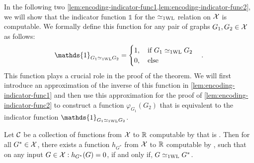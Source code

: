 In the following two \cref{lem:encoding-indicator-func1,lem:encoding-indicator-func2}, we will show that the indicator function $\mathds{1}$ for the $\simeq_{\text{1WL}}$ relation on $\mathcal{X}$ is \wlnn computable. We formally define this function for any pair of graphs $G_1, G_2 \in \mathcal{X}$ as follows:
\begin{equation*}
    \mathds{1}_{G_1 \wliso G_2} = \begin{cases}
        1, \quad \text{if $G_1 \wliso G_2$}\\
        0, \quad \text{else}
    \end{cases}.
\end{equation*}
This function plays a crucial role in the proof of the theorem. We will first introduce an approximation of the inverse of this function in \cref{lem:encoding-indicator-func1} and then use this approximation for the proof of \cref{lem:encoding-indicator-func2} to construct a function $\varphi_{G_1}(G_2)$ that is equivalent to the indicator function $\mathds{1}_{G_1 \wliso G_2}$.

\begin{lemma}\label{lem:encoding-indicator-func1}
    Let $\mathcal{C}$ be a collection of functions from $\mathcal{X}$ to $\mathbb{R}$ computable by \wlnn that is \wldisc. Then for all $G^* \in \mathcal{X}$, there exists a function $h_{G^*}$ from $\mathcal{X}$ to $\mathbb{R}$ computable by \wlnn, such that on any input $G \in \mathcal{X}: h_{G^*}(G) = 0$, if and only if, $G \simeq_{\text{1WL}} G^*$.
\end{lemma}

